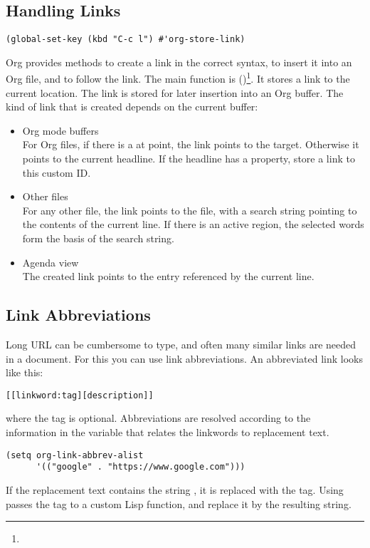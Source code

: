 \subsection{Handling Links}
\label{sec:handling-links}

\begin{lrbox}{\lstbox}
\begin{lstlisting}[language=elisp, basicstyle=\footnotesize]
(global-set-key (kbd "C-c l") #'org-store-link)
\end{lstlisting}
\end{lrbox}

Org provides methods to create a link in the correct syntax, to insert it into an Org file, and to follow the link.
The main function is  ()\footnote{\usebox{\lstbox}}.
It stores a link to the current location. The link is stored for later insertion into an Org buffer.
The kind of link that is created depends on the current buffer:
\begin{itemize}
\item Org mode buffers\\
  For Org files, if there is a  at point, the link points to the target.
  Otherwise it points to the current headline.
  If the headline has a  property, store a link to this custom ID.
\item Other files\\
  For any other file, the link points to the file, with a search string pointing to the contents of the current line.
  If there is an active region, the selected words form the basis of the search string.
\item Agenda view\\
  The created link points to the entry referenced by the current line.
\end{itemize}

\subsection{Link Abbreviations}
\label{sec:link-abbreviations}

Long URL can be cumbersome to type, and often many similar links are needed in a document.
For this you can use link abbreviations.
An abbreviated link looks like this:
\begin{verbatim}
[[linkword:tag][description]]
\end{verbatim}
where the tag is optional.
Abbreviations are resolved according to the information in the variable  that relates the linkwords to replacement text.
\begin{lstlisting}[language=elisp]
(setq org-link-abbrev-alist
      '(("google" . "https://www.google.com")))
\end{lstlisting}
If the replacement text contains the string , it is replaced with the tag.
Using  passes the tag to a custom Lisp function, and replace it by the resulting string.



